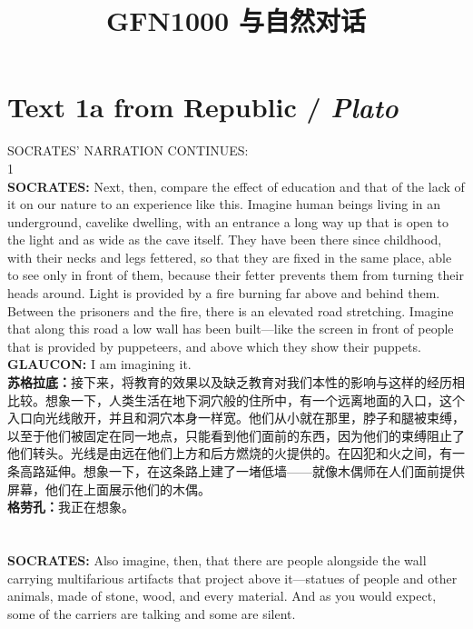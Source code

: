\documentclass{article}
\begin{document}
\title{GFN1000 与自然对话} %
\maketitle %
\newpage

\setcounter{secnumdepth}{0} %
\tableofcontents

\newpage
\section{Text 1a from Republic / \textit{Plato}}
SOCRATES’ NARRATION CONTINUES:\\
1\\
\textbf{SOCRATES:} Next, then, compare the effect of education and that of the lack of it on our nature to an experience like this. Imagine human beings living in an underground, cavelike dwelling, with an entrance a long way up that is open to the light and as wide as the cave itself. They have been there since childhood, with their necks and legs fettered, so that they are fixed in the same place, able to see only in front of them, because their fetter prevents them from turning their heads around. Light is provided by a fire burning far above and behind them. Between the prisoners and the fire, there is an elevated road stretching. Imagine that along this road a low wall has been built—like the screen in front of people that is provided by puppeteers, and above which they show their puppets.\\
\textbf{GLAUCON:} I am imagining it.\\
\textbf{苏格拉底：}接下来，将教育的效果以及缺乏教育对我们本性的影响与这样的经历相比较。想象一下，人类生活在地下洞穴般的住所中，有一个远离地面的入口，这个入口向光线敞开，并且和洞穴本身一样宽。他们从小就在那里，脖子和腿被束缚，以至于他们被固定在同一地点，只能看到他们面前的东西，因为他们的束缚阻止了他们转头。光线是由远在他们上方和后方燃烧的火提供的。在囚犯和火之间，有一条高路延伸。想象一下，在这条路上建了一堵低墙——就像木偶师在人们面前提供屏幕，他们在上面展示他们的木偶。\\
\textbf{格劳孔：}我正在想象。\\
\\\\
\textbf{SOCRATES:} Also imagine, then, that there are people alongside the wall carrying multifarious artifacts that project above it—statues of people and other animals, made of stone, wood, and every material. And as you would expect, some of the carriers are talking and some are silent.\\
\end{document}
